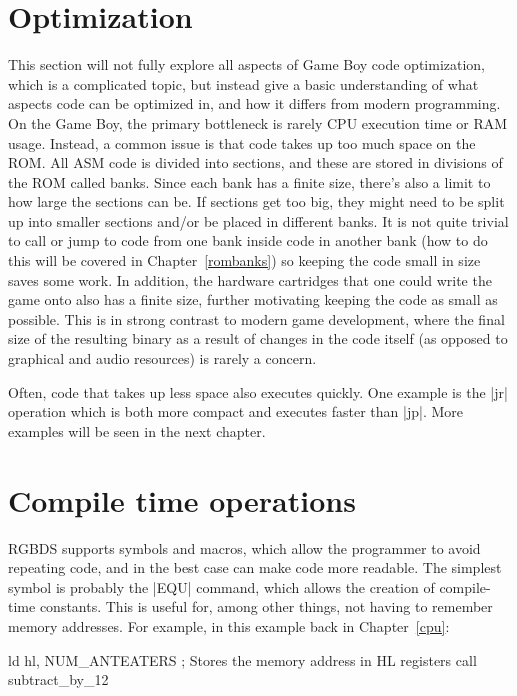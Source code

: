 \documentclass[11pt]{book}
\begin{document}
\section{Optimization}
\label{optimize}
This section will not fully explore all aspects of Game Boy code optimization, which is a complicated topic, but instead give a basic understanding of what aspects code can be optimized in, and how it differs from modern programming. On the Game Boy, the primary bottleneck is rarely CPU execution time or RAM usage. Instead, a common issue is that code takes up too much space on the ROM. All ASM code is divided into sections, and these are stored in divisions of the ROM called banks. Since each bank has a finite size, there's also a limit to how large the sections can be. If sections get too big, they might need to be split up into smaller sections and/or be placed in different banks. It is not quite trivial to call or jump to code from one bank inside code in another bank (how to do this will be covered in Chapter~\ref{rombanks}) so keeping the code small in size saves some work. In addition, the hardware cartridges that one could write the game onto also has a finite size, further motivating keeping the code as small as possible. This is in strong contrast to modern game development, where the final size of the resulting binary as a result of changes in the code itself (as opposed to graphical and audio resources) is rarely a concern.

Often, code that takes up less space also executes quickly. One example is the |jr| operation which is both more compact and executes faster than |jp|. More examples will be seen in the next chapter.

\section{Compile time operations}
\label{compiletime}
RGBDS supports symbols and macros, which allow the programmer to avoid repeating code, and in the best case can make code more readable. The simplest symbol is probably the |EQU| command, which allows the creation of compile-time constants. This is useful for, among other things, not having to remember memory addresses. For example, in this example back in Chapter~\ref{cpu}:

\begin{code}
ld hl, NUM_ANTEATERS ; Stores the memory address in HL registers
call subtract_by_12
\end{code}
\end{document}
